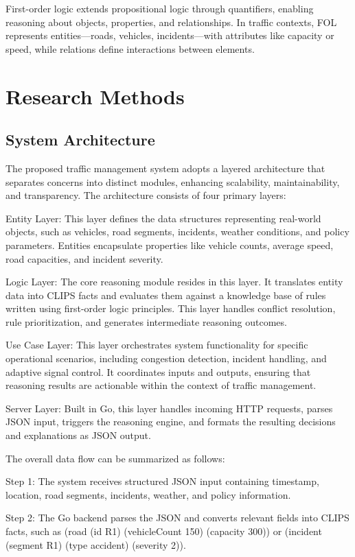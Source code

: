 \documentclass{article}
\begin{document}
First-order logic extends propositional logic through quantifiers, enabling reasoning about objects, properties, and relationships. In traffic contexts, FOL represents entities—roads, vehicles, incidents—with attributes like capacity or speed, while relations define interactions between elements.

\section{Research Methods}

\subsection{System Architecture}

The proposed traffic management system adopts a layered architecture that separates concerns into distinct modules, enhancing scalability, maintainability, and transparency. The architecture consists of four primary layers:

Entity Layer: This layer defines the data structures representing real-world objects, such as vehicles, road segments, incidents, weather conditions, and policy parameters. Entities encapsulate properties like vehicle counts, average speed, road capacities, and incident severity.

Logic Layer: The core reasoning module resides in this layer. It translates entity data into CLIPS facts and evaluates them against a knowledge base of rules written using first-order logic principles. This layer handles conflict resolution, rule prioritization, and generates intermediate reasoning outcomes.

Use Case Layer: This layer orchestrates system functionality for specific operational scenarios, including congestion detection, incident handling, and adaptive signal control. It coordinates inputs and outputs, ensuring that reasoning results are actionable within the context of traffic management.

Server Layer: Built in Go, this layer handles incoming HTTP requests, parses JSON input, triggers the reasoning engine, and formats the resulting decisions and explanations as JSON output.

The overall data flow can be summarized as follows:

Step 1: The system receives structured JSON input containing timestamp, location, road segments, incidents, weather, and policy information.

Step 2: The Go backend parses the JSON and converts relevant fields into CLIPS facts, such as (road (id R1) (vehicleCount 150) (capacity 300)) or (incident (segment R1) (type accident) (severity 2)).
\end{document}
